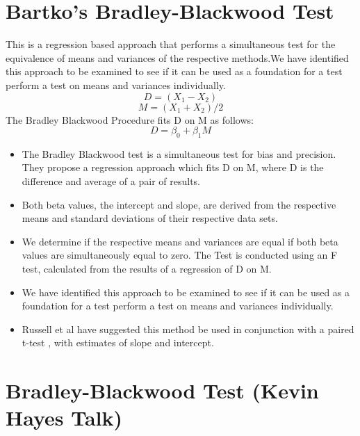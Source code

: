 \documentclass[12pt, a4paper]{report}
\theoremstyle{plain}
\theoremstyle{definition}
\theoremstyle{remark}
\begin{document}
	\section{Bartko's Bradley-Blackwood Test}
	This is a regression based
	approach that performs a simultaneous test for the equivalence of
	means and variances of the respective methods.We have identified
	this approach  to be examined to see if it can be used as a
	foundation for a test perform a test on
	means and variances individually.
	\begin{equation}
	D = (X_{1}-X_{2})
	\end{equation}
	\begin{equation}
	M = (X_{1} + X_{2}) /2
	\end{equation}
	The Bradley Blackwood Procedure fits D on M as follows:
	\begin{equation}
	D = \beta_{0} + \beta_{1}M
	\end{equation}
	\begin{itemize}
		\item The Bradley Blackwood test is a simultaneous test for bias and
		precision. They propose a regression approach which fits D on M,
		where D is the difference and average of a pair of results.
		\item Both beta values, the intercept and slope, are derived from the respective means and
		standard deviations of their respective data sets.
		\item We determine if the respective means and variances are equal if
		both beta values are simultaneously equal to zero. The Test is
		conducted using an F test, calculated from the results of a
		regression of D on M.
		\item We have identified this approach  to be examined to see if it can
		be used as a foundation for a test perform a test on means and
		variances individually.
		\item Russell et al have suggested this method be used in conjunction
		with a paired t-test , with estimates of slope and intercept.
	\end{itemize}
	
	
	
	
	\newpage
	\section{Bradley-Blackwood Test (Kevin Hayes Talk)}
	
\end{document}
